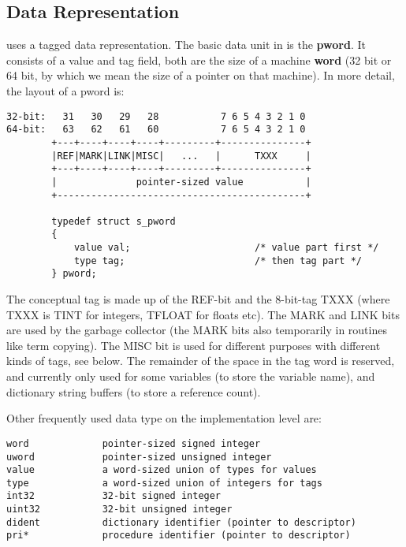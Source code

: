 \subsection{Data Representation}
\label{chapdatarep}

{\eclipse} uses a tagged  data representation.
The basic data unit in {\eclipse} is the {\bf pword}.
It consists of a value and tag field, both are the size of a machine
{\bf word} (32 bit or 64 bit, by which we mean the size of
a pointer on that machine). In more detail, the layout of a pword is:
\begin{verbatim}
32-bit:   31   30   29   28           7 6 5 4 3 2 1 0
64-bit:   63   62   61   60           7 6 5 4 3 2 1 0
        +---+----+----+----+---------+---------------+
        |REF|MARK|LINK|MISC|   ...   |      TXXX     |
        +---+----+----+----+---------+---------------+
        |              pointer-sized value           |
        +--------------------------------------------+

        typedef struct s_pword
        {
            value val;                      /* value part first */
            type tag;                       /* then tag part */
        } pword;
\end{verbatim}
The conceptual tag is made up of the REF-bit and the 8-bit-tag TXXX
(where TXXX is TINT for integers, TFLOAT for floats etc).
The MARK  and LINK  bits are used by the garbage collector (the MARK
bits also temporarily in routines like term copying).
The MISC bit is used for different purposes with different kinds of tags,
see below.
The remainder of the space in the tag word is reserved, and currently
only used for some variables (to store the variable name),
and dictionary string buffers (to store a reference count).

Other frequently used data type on the implementation level are:
\begin{verbatim}
word             pointer-sized signed integer
uword            pointer-sized unsigned integer
value            a word-sized union of types for values
type             a word-sized union of integers for tags
int32            32-bit signed integer
uint32           32-bit unsigned integer
dident           dictionary identifier (pointer to descriptor)
pri*             procedure identifier (pointer to descriptor)
\end{verbatim}


